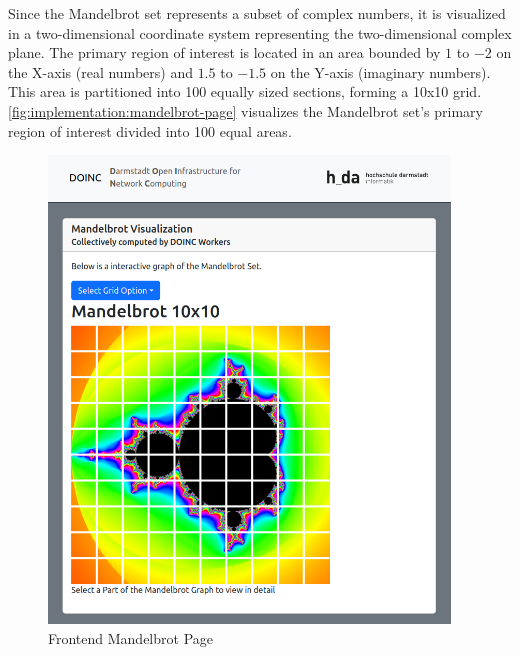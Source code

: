 Since the Mandelbrot set represents a subset of complex numbers, it is visualized in a two-dimensional coordinate system representing the two-dimensional complex plane. The primary region of interest is located in an area bounded by $1$ to $-2$ on the X-axis (real numbers) and $1.5$ to $-1.5$ on the Y-axis (imaginary numbers). This area is partitioned into 100 equally sized sections, forming a 10x10 grid. \autoref{fig:implementation:mandelbrot-page} visualizes the Mandelbrot set's primary region of interest divided into 100 equal areas.
\clearpage 
\begin{figure}[htbp]
    \centering
    \includegraphics[width=0.95\textwidth]{gfx/figures/mandelbrot-page.png}
    \caption{Frontend Mandelbrot Page}
    \label{fig:implementation:mandelbrot-page}
\end{figure}
~\\
